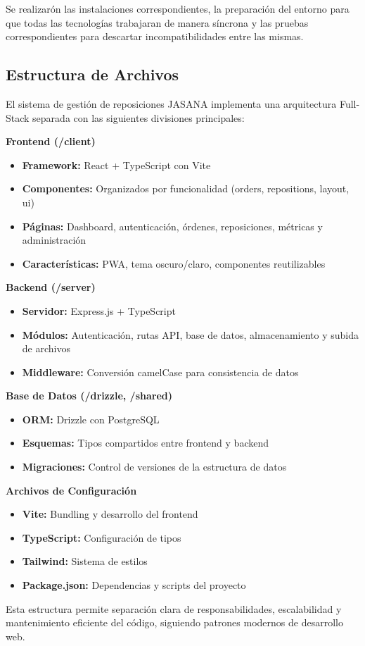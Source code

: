 \documentclass[12pt,letterpaper,spanish]{report}
\begin{document}
Se realizarón las instalaciones correspondientes, la preparación del entorno para que todas las tecnologías trabajaran de manera síncrona y las pruebas correspondientes para descartar incompatibilidades entre las mismas.

\subsection{Estructura de Archivos}
El sistema de gestión de reposiciones JASANA implementa una arquitectura Full-Stack separada con las siguientes divisiones principales:
\vspace{1em}

\textbf{Frontend (/client)}
    \begin{itemize}
    \item \textbf {Framework:} React + TypeScript con Vite
    \item \textbf {Componentes:} Organizados por funcionalidad (orders, repositions, layout, ui)
    \item \textbf {Páginas:} Dashboard, autenticación, órdenes, reposiciones, métricas y administración
    \item \textbf {Características:} PWA, tema oscuro/claro, componentes reutilizables
    \end{itemize}
    
\textbf{Backend (/server)}
\begin{itemize}
    \item \textbf{Servidor:} Express.js + TypeScript
    \item \textbf{Módulos:} Autenticación, rutas API, base de datos, almacenamiento y subida de archivos
    \item \textbf{Middleware:} Conversión camelCase para consistencia de datos
\end{itemize}

\textbf{Base de Datos (/drizzle, /shared)}
\begin{itemize}
    \item \textbf{ORM:} Drizzle con PostgreSQL
    \item \textbf{Esquemas:} Tipos compartidos entre frontend y backend
    \item \textbf{Migraciones:} Control de versiones de la estructura de datos
\end{itemize}

\textbf{Archivos de Configuración}
\begin{itemize}
    \item \textbf{Vite:} Bundling y desarrollo del frontend
    \item \textbf{TypeScript:} Configuración de tipos
    \item \textbf{Tailwind:} Sistema de estilos
    \item \textbf{Package.json:} Dependencias y scripts del proyecto
\end{itemize}
Esta estructura permite separación clara de responsabilidades, escalabilidad y mantenimiento eficiente del código, siguiendo patrones modernos de desarrollo web.
\end{document}
